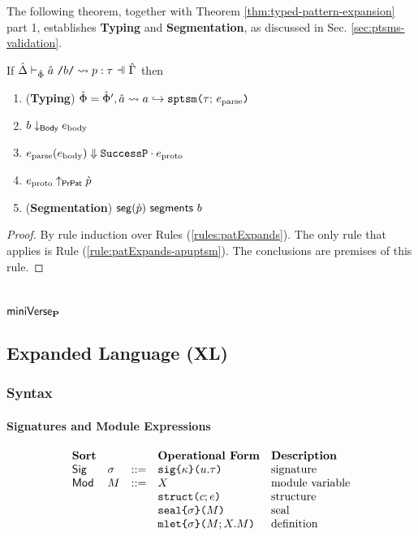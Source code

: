 \begin{grayparbox}
The following theorem, together with Theorem \ref{thm:typed-pattern-expansion} part 1, establishes \textbf{Typing} and \textbf{Segmentation}, as discussed in Sec. \ref{sec:ptsms-validation}.

\begin{theorem}
\label{thm:spTSM-Typing-Segmentation}
If $\patExpands{\upctx}{\uPhi}{\utsmap{\tsmv}{b}}{p}{\tau}$ then 
\begin{enumerate}
        \item (\textbf{Typing}) $\hat\Phi=\hat\Phi', \hat{a} \leadsto a \hookrightarrow \texttt{sptsm}\texttt{(}\tau;\,e_\text{parse}\texttt{)}$
        \item $b \downarrow_\mathsf{Body} e_\text{body}$
        \item $e_\text{parse}(e_\text{body}) \Downarrow {\mathtt{SuccessP}}\cdot{e_\text{proto}}$
        \item $e_\text{proto} \uparrow_\mathsf{PrPat} \grave{p}$
        \item (\textbf{Segmentation}) $\mathsf{seg}(\grave{p})~\mathsf{segments}~b$
\end{enumerate}
\end{theorem}
\begin{proof} By rule induction over Rules (\ref{rules:patExpands}). The only rule that applies is Rule (\ref{rule:patExpands-apuptsm}). The conclusions are premises of this rule.
\end{proof}
\end{grayparbox}


\chapter{$\mathsf{miniVerse}_\textbf{P}$}\label{appendix:miniVerseParam}

\clearpage
\section{Expanded Language (XL)}
\subsection{Syntax}
\subsubsection{Signatures and Module Expressions}
\[\begin{array}{lllllll}
\textbf{Sort} & & & \textbf{Operational Form} 
& \textbf{Description}\\
\mathsf{Sig} & \sigma & ::= & \asignature{\kappa}{u}{\tau} 
& \text{signature}\\
\mathsf{Mod} & M & ::= & X 
& \text{module variable}\\
&&& \astruct{c}{e} 
& \text{structure}\\
&&& \aseal{\sigma}{M} 
& \text{seal}\\
&&& \amlet{\sigma}{M}{X}{M} %
& \text{definition}
\end{array}\]

